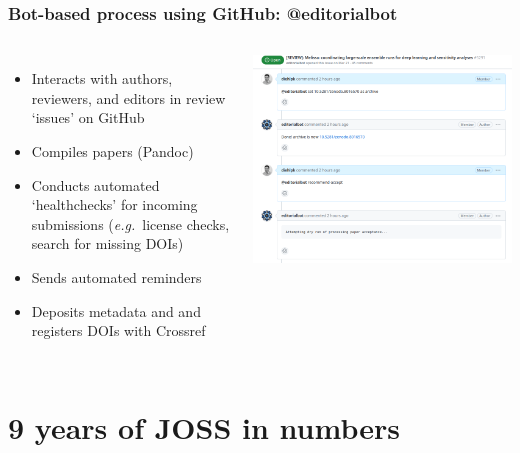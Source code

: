 \begin{frame}\frametitle{Bot-based process using GitHub: @editorialbot}

    \begin{columns}
    \begin{itemize}
        \item Interacts with authors, reviewers, and editors
in review ‘issues’ on GitHub
\item Compiles papers (Pandoc)
\item Conducts automated ‘healthchecks’ for
incoming submissions (\emph{e.g.}\ license checks,
search for missing DOIs)
\item Sends automated reminders
\item Deposits metadata and
 and 
registers DOIs with Crossref
    \end{itemize}
        
        \centering
        \includegraphics[width=\textwidth]{joss-github.png}
    \end{columns}

\end{frame}

\section{9 years of JOSS in numbers}

